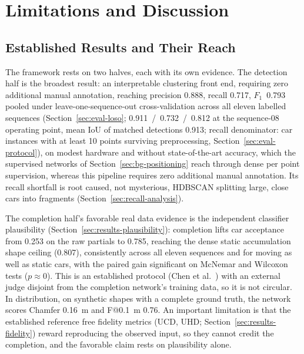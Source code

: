 \documentclass[a4paper,12pt]{report}
\begin{document}
\section{Limitations and Discussion}
\label{sec:disc-limitations}

\subsection{Established Results and Their Reach}
\label{sec:disc-what-holds}

The framework rests on two halves, each with its own evidence. The detection half is
the broadest result: an interpretable clustering front end, requiring zero additional
manual annotation, reaching
precision \num{0.888}, recall \num{0.717}, $F_1$~\num{0.793} pooled under
leave-one-sequence-out cross-validation across all eleven labelled sequences
(Section~\ref{sec:eval-loso}; \num{0.911}~/~\num{0.732}~/~\num{0.812} at the sequence-08
operating point, mean IoU of matched detections \num{0.913}; recall denominator: car
instances with at least \num{10} points surviving preprocessing,
Section~\ref{sec:eval-protocol}), on modest hardware and without state-of-the-art accuracy,
which the supervised networks of Section~\ref{sec:bg-positioning} reach through dense
per point supervision, whereas this pipeline requires zero additional manual annotation. Its recall shortfall is root caused, not mysterious,
HDBSCAN splitting large, close cars into fragments (Section~\ref{sec:recall-analysis}).

The completion half's favorable real data evidence is the independent classifier
plausibility (Section~\ref{sec:results-plausibility}): completion lifts car acceptance from
\num{0.253} on the raw partials to \num{0.785}, reaching the dense static accumulation shape
ceiling (\num{0.807}), consistently across all eleven sequences and for moving as well as
static cars, with the paired gain significant on McNemar and Wilcoxon tests ($p\approx0$).
This is an established protocol (Chen et al.~\cite{chen2020unpaired}) with an external judge
disjoint from the completion network's training data, so it is not circular. In distribution,
on synthetic shapes with a complete ground truth, the network scores Chamfer \SI{0.16}{\metre}
and F@\SI{0.1}{\metre} \num{0.76}. An important limitation is that the established
reference free fidelity metrics (UCD, UHD; Section~\ref{sec:results-fidelity}) reward
reproducing the observed input, so they cannot credit the completion, and the favorable claim
rests on plausibility alone.
\end{document}

